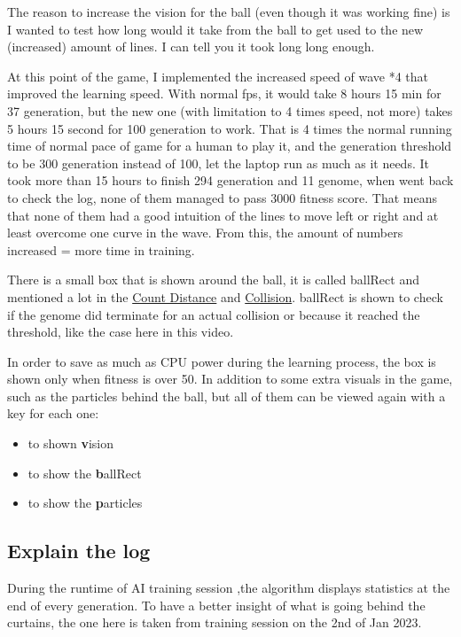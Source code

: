 The reason to increase the vision for the ball (even though it was working fine) is I wanted to test how long would it take from the ball to get used to the new (increased) amount of lines. I can tell you it took long long enough.

At this point of the game, I implemented the increased speed of wave *4 that improved the learning speed. With normal fps, it would take 8 hours 15 min for 37 generation, but the new one (with limitation to 4 times speed, not more) takes 5 hours 15 second for 100 generation to work. That is 4 times the normal running time of normal pace of game for a human to play it, and the generation threshold to be 300 generation instead of 100, let the laptop run as much as it needs. It took more than 15 hours to finish 294 generation and 11 genome, when went back to check the log, none of them managed to pass 3000 fitness score. That means that none of them had a good intuition of the lines to move left or right and at least overcome one curve in the wave. From this, the amount of numbers increased = more time in training.

There is a small box that is shown around the ball, it is called ballRect and mentioned a lot in the \hyperref[sec:count-distance]{Count Distance} and \hyperref[sec:collision]{Collision}. ballRect is shown to check if the genome did terminate for an actual collision or because it reached the threshold, like the case here in this video.

In order to save as much as CPU power during the learning process, the box is shown only when fitness is over 50. In addition to some extra visuals in the game, such as the particles behind the ball, but all of them can be viewed again with a key for each one:
\begin{itemize}
\item {} to shown \textbf{v}ision
\item {} to show the \textbf{b}allRect
\item {} to show the \textbf{p}articles
\end{itemize}

\subsection{Explain the log}\label{sec:explain-the-log}

During the runtime of AI training session ,the algorithm displays statistics at the end of every generation. To have a better insight of what is going behind the curtains, the one here is taken from training session on the 2nd of Jan 2023.

